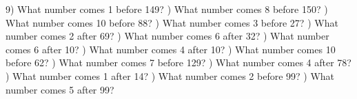 \documentclass{article}%
\begin{document}
9) What number comes 1 before 149?%
\newline%
\newline%
) What number comes 8 before 150?%
\newline%
\newline%
) What number comes 10 before 88?%
\newline%
\newline%
) What number comes 3 before 27?%
\newline%
\newline%
) What number comes 2 after 69?%
\newline%
\newline%
) What number comes 6 after 32?%
\newline%
\newline%
) What number comes 6 after 10?%
\newline%
\newline%
) What number comes 4 after 10?%
\newline%
\newline%
) What number comes 10 before 62?%
\newline%
\newline%
) What number comes 7 before 129?%
\newline%
\newline%
) What number comes 4 after 78?%
\newline%
\newline%
) What number comes 1 after 14?%
\newline%
\newline%
) What number comes 2 before 99?%
\newline%
\newline%
) What number comes 5 after 99?%
\newline%
\newline%
\newline%
\end{document}
